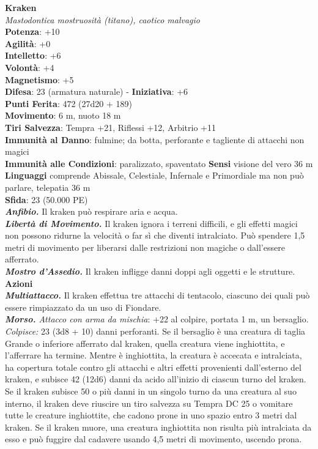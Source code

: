 \begin{multicols}{2}
\medskip\textbf{Kraken}\\
\emph{Mastodontica mostruosità (titano), caotico malvagio}\\
\textbf{Potenza}: +10\\
\textbf{Agilità}: +0\\
\textbf{Intelletto}: +6\\
\textbf{Volontà}: +4\\
\textbf{Magnetismo}: +5\\
\textbf{Difesa}: 23 (armatura naturale) - \textbf{Iniziativa}: +6\\
\textbf{Punti Ferita}: 472 (27d20 + 189) \\
\textbf{Movimento}: 6 m, nuoto 18 m\\
\textbf{Tiri Salvezza}: Tempra +21, Riflessi +12, Arbitrio +11\\
\textbf{Immunità al Danno}: fulmine; da botta, perforante e tagliente di attacchi non magici\\
\textbf{Immunità alle Condizioni}: paralizzato, spaventato
\textbf{Sensi} visione del vero 36 m\\
\textbf{Linguaggi} comprende Abissale, Celestiale, Infernale e Primordiale ma non può parlare, telepatia 36 m \\
\textbf{Sfida}: 23 (50.000 PE)\smallskip\\
\emph{\textbf{Anfibio.}} Il kraken può respirare aria e acqua.\\
\emph{\textbf{Libertà di Movimento.}} Il kraken ignora i terreni difficili, e gli effetti magici non possono ridurne la velocità o far sì che diventi intralciato. Può spendere 1,5 metri di movimento per liberarsi dalle restrizioni non magiche o dall'essere afferrato.\\
\emph{\textbf{Mostro d'Assedio.}} Il kraken infligge danni doppi agli oggetti e le strutture.\\
\smallskip\textbf{Azioni}\\
\emph{\textbf{Multiattacco.}} Il kraken effettua tre attacchi di tentacolo, ciascuno dei quali può essere rimpiazzato da un uso di Fiondare.\\
\emph{\textbf{Morso.} Attacco con arma da mischia}: +22 al colpire, portata 1 m, un bersaglio.\\
\emph{Colpisce:} 23 (3d8 + 10) danni perforanti. Se il bersaglio è una creatura di taglia Grande o inferiore afferrato dal kraken, quella creatura viene inghiottita, e l'afferrare ha termine. Mentre è inghiottita, la creatura è accecata e intralciata, ha copertura totale contro gli attacchi e altri effetti provenienti dall'esterno del kraken, e subisce 42 (12d6) danni da acido all'inizio di ciascun turno del kraken.\\
Se il kraken subisce 50 o più danni in un singolo turno da una creatura al suo interno, il kraken deve riuscire un tiro salvezza su Tempra DC 25 o vomitare tutte le creature inghiottite, che cadono prone in uno spazio entro 3 metri dal kraken. Se il kraken muore, una creatura inghiottita non risulta più intralciata da esso e può fuggire dal cadavere usando 4,5 metri di movimento, uscendo prona.\\


\end{multicols}
